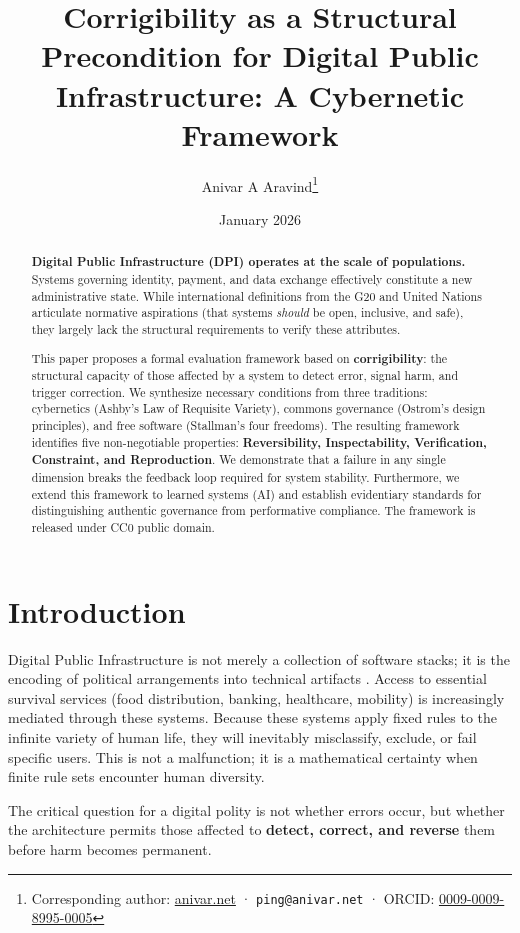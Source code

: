 \documentclass{article}
\title{Corrigibility as a Structural Precondition for Digital Public Infrastructure: A Cybernetic Framework}
\author[1]{Anivar A Aravind\thanks{Corresponding author: \href{https://anivar.net}{anivar.net} · \texttt{ping@anivar.net} · ORCID: \href{https://orcid.org/0009-0009-8995-0005}{0009-0009-8995-0005}}}
\affil[1]{Independent Researcher}
\date{January 2026}
\begin{document}
\maketitle

\begin{abstract}
\textbf{Digital Public Infrastructure (DPI) operates at the scale of populations.} Systems governing identity, payment, and data exchange effectively constitute a new administrative state. While international definitions from the G20 and United Nations articulate normative aspirations (that systems \textit{should} be open, inclusive, and safe), they largely lack the structural requirements to verify these attributes.

This paper proposes a formal evaluation framework based on \textbf{corrigibility}: the structural capacity of those affected by a system to detect error, signal harm, and trigger correction. We synthesize necessary conditions from three traditions: cybernetics (Ashby's Law of Requisite Variety), commons governance (Ostrom's design principles), and free software (Stallman's four freedoms). The resulting framework identifies five non-negotiable properties: \textbf{Reversibility, Inspectability, Verification, Constraint, and Reproduction}. We demonstrate that a failure in any single dimension breaks the feedback loop required for system stability. Furthermore, we extend this framework to learned systems (AI) and establish evidentiary standards for distinguishing authentic governance from performative compliance. The framework is released under CC0 public domain.
\end{abstract}

\section{Introduction}

Digital Public Infrastructure is not merely a collection of software stacks; it is the encoding of political arrangements into technical artifacts \citep{winner1980}. Access to essential survival services (food distribution, banking, healthcare, mobility) is increasingly mediated through these systems. Because these systems apply fixed rules to the infinite variety of human life, they will inevitably misclassify, exclude, or fail specific users. This is not a malfunction; it is a mathematical certainty when finite rule sets encounter human diversity.

The critical question for a digital polity is not whether errors occur, but whether the architecture permits those affected to \textbf{detect, correct, and reverse} them before harm becomes permanent.
\end{document}

